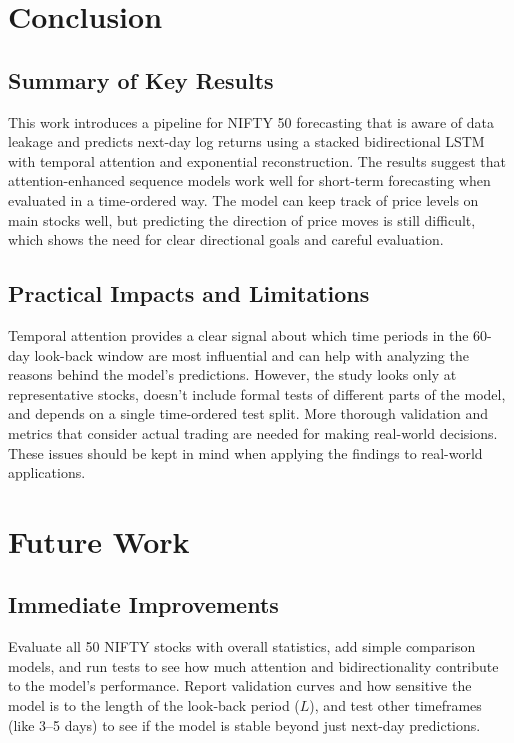 \documentclass[conference]{IEEEtran}
\begin{document}
\section{Conclusion}

\subsection{Summary of Key Results}

This work introduces a pipeline for NIFTY 50 forecasting that is aware of data leakage and predicts next-day log returns using a stacked bidirectional LSTM with temporal attention and exponential reconstruction. The results suggest that attention-enhanced sequence models work well for short-term forecasting when evaluated in a time-ordered way. The model can keep track of price levels on main stocks well, but predicting the direction of price moves is still difficult, which shows the need for clear directional goals and careful evaluation.

\subsection{Practical Impacts and Limitations}

Temporal attention provides a clear signal about which time periods in the 60-day look-back window are most influential and can help with analyzing the reasons behind the model’s predictions. However, the study looks only at representative stocks, doesn’t include formal tests of different parts of the model, and depends on a single time-ordered test split. More thorough validation and metrics that consider actual trading are needed for making real-world decisions. These issues should be kept in mind when applying the findings to real-world applications.

\section{Future Work}

\subsection{Immediate Improvements}

Evaluate all 50 NIFTY stocks with overall statistics, add simple comparison models, and run tests to see how much attention and bidirectionality contribute to the model’s performance. Report validation curves and how sensitive the model is to the length of the look-back period ($L$), and test other timeframes (like 3--5 days) to see if the model is stable beyond just next-day predictions.
\end{document}
